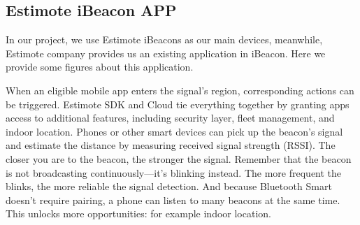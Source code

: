 \documentclass[12pt]{report}
\begin{document}
\subsection{Estimote iBeacon APP}
In our project, we use Estimote iBeacons as our main devices, meanwhile, Estimote company provides us an existing application in iBeacon. Here we provide some figures about this application.

When an eligible mobile app enters the signal's region, corresponding actions can be triggered. Estimote SDK and Cloud tie everything together by granting apps access to additional features, including security layer, fleet management, and indoor location. Phones or other smart devices can pick up the beacon’s signal and estimate the distance by measuring received signal strength (RSSI). The closer you are to the beacon, the stronger the signal. Remember that the beacon is not broadcasting continuously—it’s blinking instead. The more frequent the blinks, the more reliable the signal detection. And because Bluetooth Smart doesn’t require pairing, a phone can listen to many beacons at the same time. This unlocks more opportunities: for example indoor location.
\end{document}
